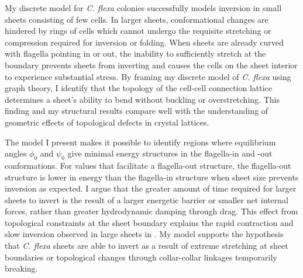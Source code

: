 My discrete model for \textit{C. flexa} colonies successfully models inversion in small sheets consisting of few cells. 
In larger sheets, conformational changes are hindered by rings of cells which cannot undergo the requisite stretching or compression required for inversion or folding. 
When sheets are already curved with flagella pointing in or out, the inability to sufficiently stretch at the boundary prevents sheets from inverting and causes the cells on the sheet interior to experience substantial stress.
By framing my discrete model of \textit{C. flexa} using graph theory, I identify that the topology of the cell-cell connection lattice determines a sheet's ability to bend without buckling or overstretching.
This finding and my structural results compare well with the understanding of geometric effects of topological defects in crystal lattices.

The model I present makes it possible to identify regions where equilibrium angles $\phi_0$ and $\psi_0$ give minimal energy structures in the flagella-in and -out conformations.
For values that facilitate a flagella-out structure, the flagella-out structure is lower in energy than the flagella-in structure when sheet size prevents inversion as expected.
I argue that the greater amount of time required for larger sheets to invert is the result of a larger energetic barrier or smaller net internal forces, rather than greater hydrodynamic damping through drag. 
This effect from topological constraints at the sheet boundary explains the rapid contraction and slow inversion observed in large sheets in \citep{brunet2019}.
My model supports the hypothesis that \textit{C. flexa} sheets are able to invert as a result of extreme stretching at sheet boundaries or topological changes through collar-collar linkages temporarily breaking.
